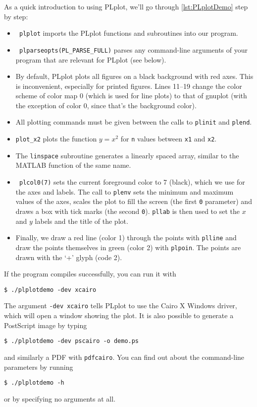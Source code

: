 As a quick introduction to using PLplot, we'll go through \autoref{lst:PLplotDemo} step by step:

%
\begin{itemize}
  \item \texttt{ plplot} imports the PLplot functions and subroutines into our program.
  \item \texttt{ plparseopts(PL\_PARSE\_FULL)} parses any command-line arguments of your program that are relevant for PLplot (see below).
  \item By default, PLplot plots all figures on a black background with red axes.
    This is inconvenient, especially for printed figures.
    Lines 11--19 change the color scheme of color map 0 (which is used for line plots) to that of gnuplot (with the exception of color 0, since that's the background color).
  \item All plotting commands must be given between the calls to \texttt{plinit} and \texttt{plend}.
  \item \texttt{plot\_x2} plots the function $y=x^2$ for \texttt{n} values between \texttt{x1} and \texttt{x2}.
  \item The \texttt{linspace} subroutine generates a linearly spaced array, similar to the MATLAB function of the same name.
  \item \texttt{ plcol0(7)} sets the current foreground color to 7 (black), which we use for the axes and labels.
    The call to \texttt{plenv} sets the minimum and maximum values of the axes, scales the plot to fill the screen (the first \texttt{0} parameter) and draws a box with tick marks (the second \texttt{0}).
    \texttt{pllab} is then used to set the $x$ and $y$ labels and the title of the plot.
  \item Finally, we draw a red line (color 1) through the points with \texttt{plline} and draw the points themselves in green (color 2) with \texttt{plpoin}.
    The points are drawn with the `+' glyph (code 2).
\end{itemize}
If the program compiles successfully, you can run it with
\begin{verbatim}
$ ./plplotdemo -dev xcairo
\end{verbatim}
The argument \texttt{-dev xcairo} tells PLplot to use the Cairo X Windows driver, which will open a window showing the plot.
It is also possible to generate a PostScript image by typing
\begin{verbatim}
$ ./plplotdemo -dev pscairo -o demo.ps
\end{verbatim}
and similarly a PDF with \texttt{pdfcairo}. You can find out about the command-line parameters by running
\begin{verbatim}
$ ./plplotdemo -h
\end{verbatim}
or by specifying no arguments at all.

